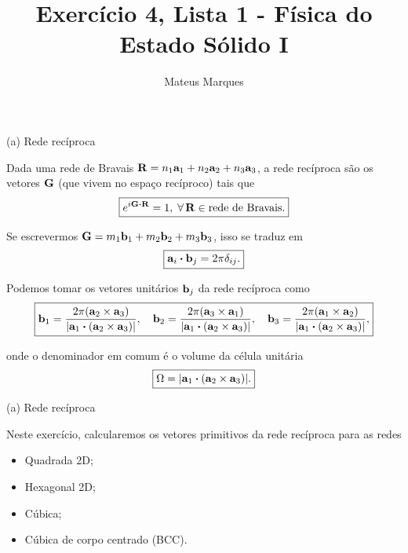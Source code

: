 \documentclass[aspectratio=169]{beamer}
\title[Exercício 4, Lista 1 - Física do Estado Sólido I]{\LARGE{Exercício 4, Lista 1 - Física do Estado Sólido I}}
\author[Mateus Marques]{\large{Mateus Marques}}
\institute[]{\small{Instituto de Física da Universidade de São Paulo}}
\begin{document}
\begin{frame}
  \titlepage
\end{frame}


\begin{frame}{(a) Rede recíproca}

Dada uma rede de Bravais $\vb{R} = n_1 \vb{a}_1 + n_2 \vb{a}_2 + n_3 \vb{a}_3$, a rede recíproca são os vetores $\vb{G}$ (que vivem no espaço recíproco) tais que
$$
\boxed{e^{i \vb{G} \vdot \vb{R}} = 1, \; \ptodo \R \in \text{rede de Bravais}.}
$$

Se escrevermos $\vb{G} = m_1 \vb{b}_1 + m_2 \vb{b}_2 + m_3 \vb{b}_3$, isso se traduz em
$$
\boxed{\a_i \vdot \b_j = 2 \pi \delta_{ij}.}
$$

Podemos tomar os vetores unitários $\vb{b}_j$ da rede recíproca como
$$
\boxed{\b_1 = \frac{2\pi (\a_2 \times \a_3)}{\abs{\a_1 \vdot (\a_2 \times \a_3)}}, \quad \b_2 = \frac{2\pi(\a_3 \times \a_1)}{\abs{\a_1 \vdot (\a_2 \times \a_3)}}, \quad \b_3 = \frac{2\pi(\a_1 \times \a_2)}{\abs{\a_1 \vdot (\a_2 \times \a_3)}},}
$$

onde o denominador em comum é o volume da célula unitária
$$
\boxed{\Omega = \abs{\a_1 \vdot (\a_2 \times \a_3)}.}
$$


\end{frame}




\begin{frame}{(a) Rede recíproca}

Neste exercício, calcularemos os vetores primitivos da rede recíproca para as redes
\n\n
\begin{itemize}
\item Quadrada 2D;
\n\n
\item Hexagonal 2D;
\n\n
\item Cúbica;
\n\n
\item Cúbica de corpo centrado (BCC).
\end{itemize}

\end{frame}


\end{document}
